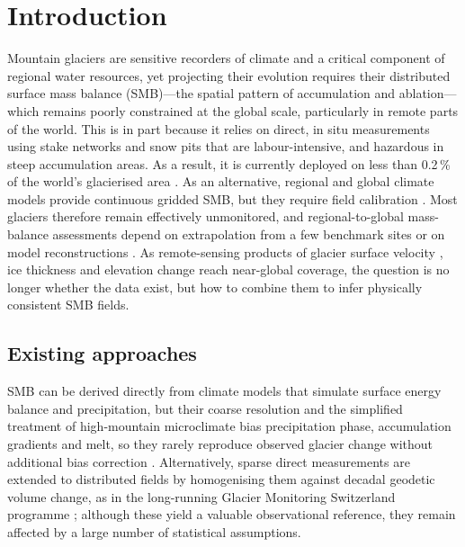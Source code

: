 \section{Introduction}\label{sec:intro}

Mountain glaciers are sensitive recorders of climate and a critical component of regional water resources, yet projecting their evolution requires their distributed surface mass balance (SMB)---the spatial pattern of accumulation and ablation---which remains poorly constrained at the global scale, particularly in remote parts of the world.
This is in part because it relies on direct, in situ measurements using stake networks and snow pits that are labour-intensive, and hazardous in steep accumulation areas. As a result, it is currently deployed on less than 0.2\,\% of the world's glacierised area \citep{cogley2011}. As an alternative, regional and global climate models provide continuous gridded SMB, but they require field calibration \citep{radic2014, marzeion2012}.
Most glaciers therefore remain effectively unmonitored, and regional-to-global mass-balance assessments depend on extrapolation from a few benchmark sites or on model reconstructions \citep{hugonnet2021, zemp2019}.
As remote-sensing products of glacier surface
velocity \citep{millan2022}, ice thickness \citep{farinotti2019, millan2022} and
elevation change \citep{hugonnet2021, beraud2023} reach near-global coverage, the
question is no longer whether the data exist, but how to combine them to infer
physically consistent SMB fields.

\subsection{Existing approaches}\label{sec:sota}
SMB can be derived directly from climate models that simulate surface energy balance and precipitation, but their coarse resolution and the simplified treatment of high-mountain microclimate bias precipitation phase, accumulation gradients and melt, so they rarely reproduce observed glacier change without additional bias correction \citep{marzeion2012, rounce2020}. Alternatively, sparse direct measurements are extended to distributed fields by homogenising them against decadal geodetic volume change, as in the long-running Glacier Monitoring Switzerland programme \citep[GLAMOS;][]{glamos}; although these yield a valuable observational reference, they remain affected by a large number of statistical assumptions.

